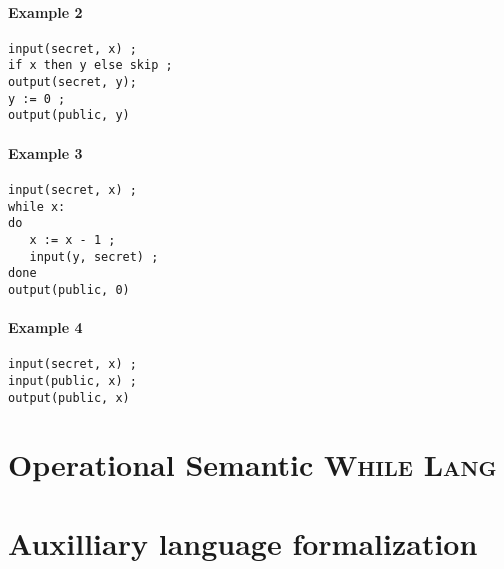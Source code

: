 \documentclass[10pt]{article}
\newcommand{\whilelang}{\textsc{While Lang} }
\begin{document}
\paragraph{Example 2}
\begin{Verbatim}[samepage=true]
input(secret, x) ;
if x then y else skip ;
output(secret, y);
y := 0 ;
output(public, y)
\end{Verbatim}

\paragraph{Example 3}
\begin{Verbatim}[samepage=true]
input(secret, x) ;
while x:
do
   x := x - 1 ;
   input(y, secret) ;
done
output(public, 0)
\end{Verbatim}

\paragraph{Example 4}
\begin{Verbatim}[samepage=true]
input(secret, x) ;
input(public, x) ;
output(public, x)
\end{Verbatim}


\section{Operational Semantic \whilelang}%




\section{Auxilliary language formalization}%



% 
% 
\end{document}
